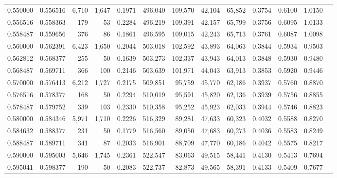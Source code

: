 \begin{tabular}{rrrrrrrrrrrrr}
0.550000 & 0.556516 &  6,710 & 1,647 &                                     0.1971 & 496,040 & 109,570 &  42,104 &  65,852 & 0.3754 & 0.6100 & 1.0150 \\
0.556516 & 0.558363 &    179 &    53 &                                     0.2284 & 496,219 & 109,391 &  42,157 &  65,799 & 0.3756 & 0.6095 & 1.0133 \\
0.558487 & 0.559656 &    376 &    86 &                                     0.1861 & 496,595 & 109,015 &  42,243 &  65,713 & 0.3761 & 0.6087 & 1.0098 \\
0.560000 & 0.562391 &  6,423 & 1,650 &                                     0.2044 & 503,018 & 102,592 &  43,893 &  64,063 & 0.3844 & 0.5934 & 0.9503 \\
0.562812 & 0.568377 &    255 &    50 &                                     0.1639 & 503,273 & 102,337 &  43,943 &  64,013 & 0.3848 & 0.5930 & 0.9480 \\
0.568487 & 0.569711 &    366 &   100 &                                     0.2146 & 503,639 & 101,971 &  44,043 &  63,913 & 0.3853 & 0.5920 & 0.9446 \\
0.570000 & 0.576413 &  6,212 & 1,727 &                                     0.2175 & 509,851 &  95,759 &  45,770 &  62,186 & 0.3937 & 0.5760 & 0.8870 \\
0.576516 & 0.578377 &    168 &    50 &                                     0.2294 & 510,019 &  95,591 &  45,820 &  62,136 & 0.3939 & 0.5756 & 0.8855 \\
0.578487 & 0.579752 &    339 &   103 &                                     0.2330 & 510,358 &  95,252 &  45,923 &  62,033 & 0.3944 & 0.5746 & 0.8823 \\
0.580000 & 0.584346 &  5,971 & 1,710 &                                     0.2226 & 516,329 &  89,281 &  47,633 &  60,323 & 0.4032 & 0.5588 & 0.8270 \\
0.584632 & 0.588377 &    231 &    50 &                                     0.1779 & 516,560 &  89,050 &  47,683 &  60,273 & 0.4036 & 0.5583 & 0.8249 \\
0.588487 & 0.589711 &    341 &    87 &                                     0.2033 & 516,901 &  88,709 &  47,770 &  60,186 & 0.4042 & 0.5575 & 0.8217 \\
0.590000 & 0.595003 &  5,646 & 1,745 &                                     0.2361 & 522,547 &  83,063 &  49,515 &  58,441 & 0.4130 & 0.5413 & 0.7694 \\
0.595041 & 0.598377 &    190 &    50 &                                     0.2083 & 522,737 &  82,873 &  49,565 &  58,391 & 0.4133 & 0.5409 & 0.7677 \\

\end{tabular}
